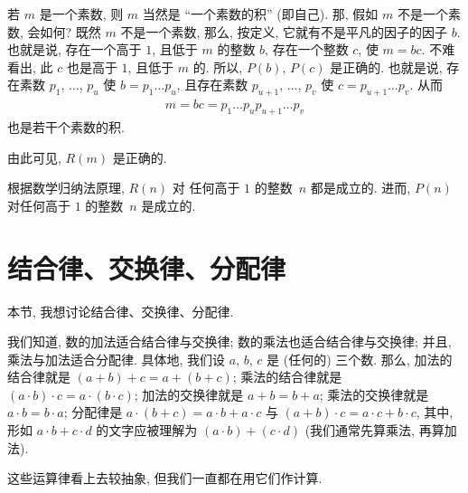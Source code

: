 \begin{example}
    若 \(m\) 是一个素数,
    则 \(m\) 当然是 ``一个素数的积'' (即自己).
    那, 假如 \(m\) 不是一个素数, 会如何?
    既然 \(m\) 不是一个素数,
    那么, 按定义, 它就有不是平凡的因子的因子 \(b\).
    也就是说, 存在一个高于 \(1\), 且低于 \(m\) 的整数 \(b\),
    存在一个整数 \(c\),
    使 \(m = bc\).
    不难看出,
    此 \(c\) 也是高于 \(1\), 且低于 \(m\) 的.
    所以, \(P(b)\), \(P(c)\) 是正确的.
    也就是说, 存在素数
    \(p_1\), \(\dots\), \(p_u\)
    使 \(b = p_1 \dots p_u\),
    且存在素数
    \(p_{u+1}\), \(\dots\), \(p_v\)
    使 \(c = p_{u+1} \dots p_v\).
    从而
    \begin{align*}
        m = bc = p_1 \dots p_u p_{u+1} \dots p_v
    \end{align*}
    也是若干个素数的积.

    由此可见, \(R(m)\) 是正确的.

    根据数学归纳法原理, \(R(n)\) 对%
    任何高于 \(1\) 的整数~\(n\) 都是成立的.
    进而, \(P(n)\) 对任何高于 \(1\) 的整数~\(n\) 是成立的.
\end{example}

\section{结合律、交换律、分配律}

本节, 我想讨论结合律、交换律、分配律.

我们知道, 数的加法适合结合律与交换律;
数的乘法也适合结合律与交换律;
并且, 乘法与加法适合分配律.
具体地, 我们设 \(a\), \(b\), \(c\) 是 (任何的) 三个数.
那么, 加法的结合律就是 \((a + b) + c = a + (b + c)\);
乘法的结合律就是 \((a \cdot b) \cdot c = a \cdot (b \cdot c)\);
加法的交换律就是 \(a + b = b + a\);
乘法的交换律就是 \(a \cdot b = b \cdot a\);
分配律是
\(a \cdot (b + c) = a \cdot b + a \cdot c\)
与
\((a + b) \cdot c = a \cdot c + b \cdot c\),
其中, 形如 \(a \cdot b + c \cdot d\)
的文字应被理解为
\((a \cdot b) + (c \cdot d)\)
(我们通常先算乘法, 再算加法).

这些运算律看上去较抽象,
但我们一直都在用它们作计算.

